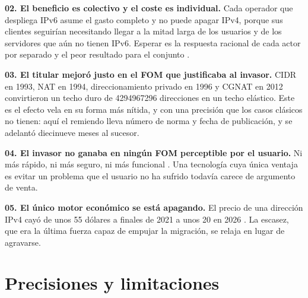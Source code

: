 \documentclass[11pt,letterpaper]{article}
\begin{document}
\textbf{02. El beneficio es colectivo y el coste es individual.} Cada operador
que despliega IPv6 asume el gasto completo y no puede apagar IPv4, porque sus
clientes seguirían necesitando llegar a la mitad larga de los usuarios y de los
servidores que aún no tienen IPv6. Esperar es la respuesta racional de cada actor por separado y el
peor resultado para el conjunto \parencite{farrell1985,oecd2014,nikkhah2016}.

\textbf{03. El titular mejoró justo en el FOM que justificaba al invasor.} CIDR
en 1993, NAT en 1994, direccionamiento privado en 1996 y CGNAT en 2012
convirtieron un techo duro de \num{4294967296} direcciones en un techo elástico.
Este es el efecto vela en su forma más nítida, y con una precisión que los casos
clásicos no tienen: aquí el remiendo lleva número de norma y fecha de
publicación, y se adelantó diecinueve meses al sucesor.

\textbf{04. El invasor no ganaba en ningún FOM perceptible por el usuario.} Ni
más rápido, ni más seguro, ni más funcional \parencite{huston2024}. Una
tecnología cuya única ventaja es evitar un problema que el usuario no ha sufrido
todavía carece de argumento de venta.

\textbf{05. El único motor económico se está apagando.} El precio de una
dirección IPv4 cayó de unos 55 dólares a finales de 2021 a unos 20 en 2026
\parencite{huston2026a,ipv4center2026}. La escasez, que era la última fuerza
capaz de empujar la migración, se relaja en lugar de agravarse.

\section{Precisiones y limitaciones}
\end{document}
